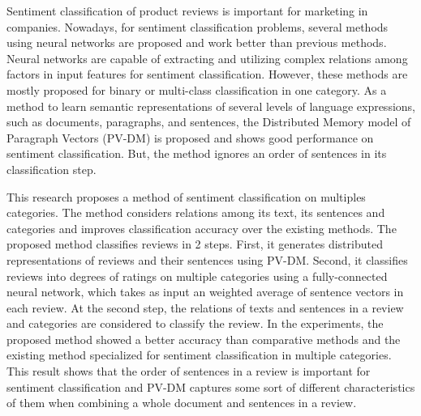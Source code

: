 Sentiment classification of product reviews is important
for marketing in companies.
%
Nowadays, for sentiment classification problems,
several methods using neural networks are proposed
and work better than previous methods.
Neural networks are capable of extracting and utilizing complex relations
among factors in input features for sentiment classification.
However, these methods are mostly proposed
for binary or multi-class classification in one category.
%
As a method to learn semantic representations of several levels
of language expressions, such as documents, paragraphs, and sentences,
the Distributed Memory model of Paragraph Vectors (PV-DM) is proposed
and shows good performance on sentiment classification.
But, the method ignores an order of sentences in its classification step.

This research proposes a method of sentiment classification
on multiples categories.
The method considers relations among its text, its sentences and categories
and improves classification accuracy over the existing methods.
%
The proposed method classifies reviews in 2 steps.
First, it generates distributed representations of reviews
and their sentences using PV-DM.
Second, it classifies reviews into degrees of ratings
on multiple categories using a fully-connected neural network,
which takes as input an weighted average of
sentence vectors in each review.
At the second step, the relations of texts and sentences in a review
and categories are considered to classify the review.
%
In the experiments, the proposed method showed a better accuracy
than comparative methods and the existing method specialized
for sentiment classification in multiple categories.
This result shows that
the order of sentences in a review is important for sentiment classification
and PV-DM captures some sort of different characteristics of them
when combining a whole document and sentences in a review.
